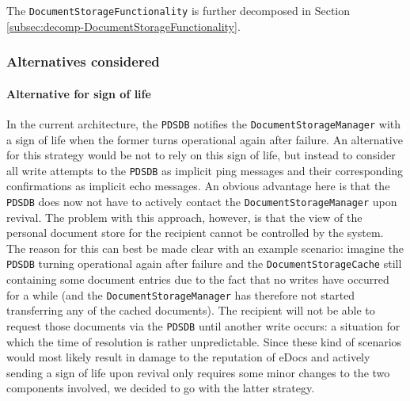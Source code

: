 \documentclass[a4paper,10pt]{article}
\begin{document}
The \texttt{DocumentStorageFunctionality} is further decomposed in Section \ref{subsec:decomp-DocumentStorageFunctionality}.
\subsubsection*{Alternatives considered}
\paragraph{Alternative for sign of life}
In the current architecture, the \texttt{PDSDB} notifies the \texttt{DocumentStorageManager} with a sign of life when the former turns operational again after failure. An alternative for this strategy would be not to rely on this sign of life, but instead to consider all write attempts to the \texttt{PDSDB} as implicit ping messages and their corresponding confirmations as implicit echo messages. An obvious advantage here is that the \texttt{PDSDB} does now not have to actively contact the \texttt{DocumentStorageManager} upon revival. The problem with this approach, however, is that the view of the personal document store for the recipient cannot be controlled by the system. The reason for this can best be made clear with an example scenario: imagine the \texttt{PDSDB} turning operational again after failure and the \texttt{DocumentStorageCache} still containing some document entries due to the fact that no writes have occurred for a while (and the \texttt{DocumentStorageManager} has therefore not started transferring any of the cached documents). The recipient will not be able to request those documents via the \texttt{PDSDB} until another write occurs: a situation for which the time of resolution is rather unpredictable. Since these kind of scenarios would most likely result in damage to the reputation of eDocs and actively sending a sign of life upon revival only requires some minor changes to the two components involved, we decided to go with the latter strategy.
\end{document}
